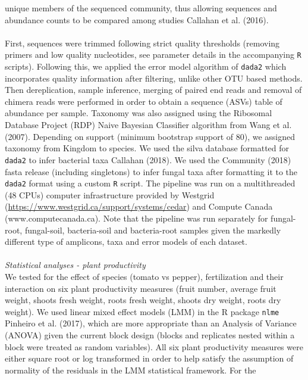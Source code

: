 \documentclass[11pt,]{article}
\begin{document}
unique members of the sequenced community, thus allowing sequences and
abundance counts to be compared among studies Callahan et al. (2016).\\
\hspace*{0.333em}\\
First, sequences were trimmed following strict quality thresholds
(removing primers and low quality nucleotides, see parameter details in
the accompanying \texttt{R} scripts). Following this, we applied the
error model algorithm of \texttt{dada2} which incorporates quality
information after filtering, unlike other OTU based methods. Then
dereplication, sample inference, merging of paired end reads and removal
of chimera reads were performed in order to obtain a sequence (ASVs)
table of abundance per sample. Taxonomy was also assigned using the
Ribosomal Database Project (RDP) Naive Bayesian Classifier algorithm
from Wang et al. (2007). Depending on support (minimum bootstrap support
of 80), we assigned taxonomy from Kingdom to species. We used the silva
database formatted for \texttt{dada2} to infer bacterial taxa Callahan
(2018). We used the Community (2018) fasta release (including
singletons) to infer fungal taxa after formatting it to the
\texttt{dada2} format using a custom \texttt{R} script. The pipeline was
run on a multithreaded (48 CPUs) computer infrastructure provided by
Westgrid (\url{https://www.westgrid.ca/support/systems/cedar}) and
Compute Canada (www.computecanada.ca). Note that the pipeline was run
separately for fungal-root, fungal-soil, bacteria-soil and bacteria-root
samples given the markedly different type of amplicons, taxa and error
models of each dataset. ~\\
\hspace*{0.333em}\\
\emph{Statistical analyses - plant productivity}\\
We tested for the effect of species (tomato vs pepper), fertilization
and their interaction on six plant productivity measures (fruit number,
average fruit weight, shoots fresh weight, roots fresh weight, shoots
dry weight, roots dry weight). We used linear mixed effect models (LMM)
in the R package \texttt{nlme} Pinheiro et al. (2017), which are more
appropriate than an Analysis of Variance (ANOVA) given the current block
design (blocks and replicates nested within a block were treated as
random variables). All six plant productivity measures were either
square root or log transformed in order to help satisfy the assumption
of normality of the residuals in the LMM statistical framework. For the
\end{document}
